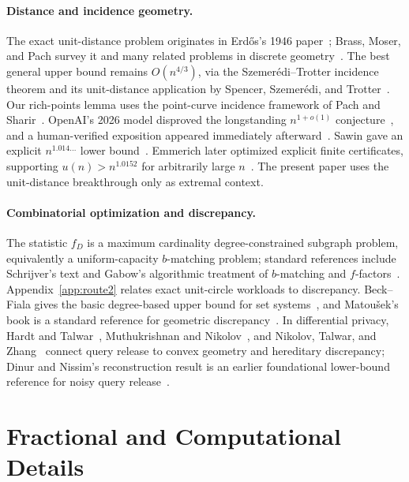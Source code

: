 \documentclass[11pt]{article}
\begin{document}
\paragraph{Distance and incidence geometry.}
The exact unit-distance problem originates in Erd\H{o}s's 1946 paper~\cite{Erdos46}; Brass, Moser, and Pach survey it and many related problems in discrete geometry~\cite{BrassMoserPach05}. The best general upper bound remains \(O(n^{4/3})\), via the Szemerédi--Trotter incidence theorem and its unit-distance application by Spencer, Szemerédi, and Trotter~\cite{SzemerediTrotter83,SpencerSzemerediTrotter84}. Our rich-points lemma uses the point-curve incidence framework of Pach and Sharir~\cite{PachSharir98}. OpenAI's 2026 model disproved the longstanding \(n^{1+o(1)}\) conjecture~\cite{OpenAI2026}, and a human-verified exposition appeared immediately afterward~\cite{Remarks2026}. Sawin gave an explicit \(n^{1.014\ldots}\) lower bound~\cite{Sawin2026}. Emmerich later optimized explicit finite certificates, supporting \(u(n)>n^{1.0152}\) for arbitrarily large \(n\)~\cite{Emmerich2026}. The present paper uses the unit-distance breakthrough only as extremal context.

\paragraph{Combinatorial optimization and discrepancy.}
The statistic \(f_D\) is a maximum cardinality degree-constrained subgraph problem, equivalently a uniform-capacity \(b\)-matching problem; standard references include Schrijver's text and Gabow's algorithmic treatment of \(b\)-matching and \(f\)-factors~\cite{Schrijver03,Gabow18}. Appendix~\ref{app:route2} relates exact unit-circle workloads to discrepancy. Beck--Fiala gives the basic degree-based upper bound for set systems~\cite{BeckFiala81}, and Matoušek's book is a standard reference for geometric discrepancy~\cite{Matousek99}. In differential privacy, Hardt and Talwar~\cite{HT10}, Muthukrishnan and Nikolov~\cite{MN12}, and Nikolov, Talwar, and Zhang~\cite{NTZ13} connect query release to convex geometry and hereditary discrepancy; Dinur and Nissim's reconstruction result is an earlier foundational lower-bound reference for noisy query release~\cite{DinurNissim03}.



\section{Fractional and Computational Details}
\label{sec:extra-computation}
\end{document}
